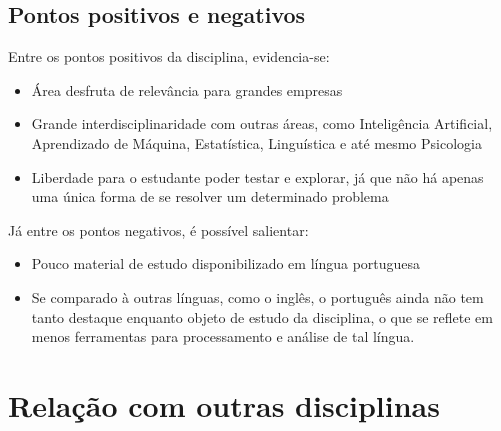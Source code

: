 \documentclass[a4paper]{article}
\begin{document}
\subsection{Pontos positivos e negativos}
Entre os pontos positivos da disciplina, evidencia-se:
\begin{itemize}
\item Área desfruta de relevância para grandes empresas
\item Grande interdisciplinaridade com outras áreas, como Inteligência Artificial, Aprendizado de Máquina, Estatística, Linguística e até mesmo Psicologia
\item Liberdade para o estudante poder testar e explorar, já que não há apenas uma única forma de se resolver um determinado problema
\end{itemize}
Já entre os pontos negativos, é possível salientar:
\begin{itemize}
\item Pouco material de estudo disponibilizado em língua portuguesa
\item Se comparado à outras línguas, como o inglês, o português ainda não tem tanto destaque enquanto objeto de estudo da disciplina, o que se reflete em menos ferramentas para processamento e análise de tal língua.
\end{itemize}




\section{Relação com outras disciplinas}
\end{document}
